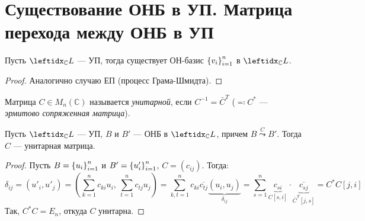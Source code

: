 \section{Существование ОНБ в УП. Матрица перехода между ОНБ в УП}

\begin{thm}
    Пусть $\lsub{\mathbb{C}}{L}$ --- УП, тогда существует ОН-базис $\left\{v_i\right\}_{i=1}^{n}$ в $\lsub{\mathbb{C}}{L}$.
\end{thm}

\begin{proof}
    Аналогично случаю ЕП (процесс Грама-Шмидта).
\end{proof}

\begin{defn}
    Матрица $C \in M_n(\mathbb{C})$ называется \textit{унитарной}, если $C^{-1} = \bar{C}^T$ ($\eqqcolon C^*$ --- \textit{эрмитово сопряженная матрица}).
\end{defn}

\begin{thm*}
    Пусть $\lsub{\mathbb{C}}{L}$ --- УП, $B$ и $B'$ --- ОНБ в $\lsub{\mathbb{C}}{L}$, причем $B \stackrel{C}{\leadsto} B'$. Тогда $C$ --- унитарная матрица.
\end{thm*}

\begin{proof}
    Пусть $B = \left\{u_i\right\}_{i=1}^{n}$ и $B' = \left\{u'_i\right\}_{i=1}^{n}$, $C = (c_{ij})$. Тогда:
    $$\delta_{ij} = (u'_i, u'_j) = \left(\sum_{k=1}^n c_{ki} u_i,\ \sum_{t=1}^n c_{tj} u_j \right) = \sum_{k,t=1}^n c_{ki} \overline{c_{tj}} \underbrace{(u_i, u_j)}_{\delta_{ij}} = \sum_{s=1}^n \underbrace{c_{si}}_{C[s, i]} \cdot \underbrace{\overline{c_{sj}}}_{\bar{C}^T[j, s]} = C^*C[j, i]$$
    Так, $C^*C = E_n$, откуда $C$ унитарна.
\end{proof}